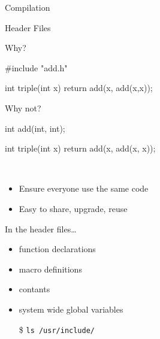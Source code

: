 \begin{frame}{Compilation}
  \begin{center}
  \end{center}
\end{frame}

\begin{frame}[fragile]{Header Files}
  \begin{minipage}{.45\linewidth}
    \begin{block}{Why?}
\begin{ccode}
#include "add.h"

int triple(int x)
{
  return add(x, add(x,x));
}
\end{ccode}
    \end{block}
  \end{minipage}\qquad
  \begin{minipage}{.45\linewidth}
    \begin{block}{Why not?}
\begin{ccode}
int add(int, int);

int triple(int x)
{
  return add(x, add(x, x));
}
\end{ccode}
    \end{block}
  \end{minipage}\\[1ex]
  \begin{itemize}
  \item Ensure everyone use the same code
  \item Easy to share, upgrade, reuse
  \end{itemize}
  \begin{block}{In the header files\ldots}
    \begin{multicols}{2}
      \begin{itemize}
      \item function declarations
      \item macro definitions
      \item contants
      \item system wide global variables
      \end{itemize}
    \end{multicols}
  \end{block}
  \begin{itemize}
  \item[\$] \texttt{ls /usr/include/}
  \end{itemize}
\end{frame}

